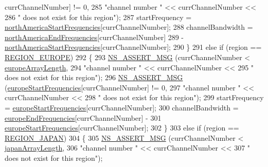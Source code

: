 \begin{DoxyCode}
      currChannelNumber] != 0,
285                          \textcolor{stringliteral}{"channel number "} << currChannelNumber <<
286                          \textcolor{stringliteral}{" does not exist for this region"});
287           startFrequency = \hyperlink{namespacens3_abd0dc95c8909f85e962a681d932219d3}{northAmericaStartFrequencies}[currChannelNumber];    
288           channelBandwidth = \hyperlink{namespacens3_a0808a28c1d4e8691369f8d7700e6deaa}{northAmericaEndFrequencies}[currChannelNumber] 
289                              - \hyperlink{namespacens3_abd0dc95c8909f85e962a681d932219d3}{northAmericaStartFrequencies}[currChannelNumber];
290         \}
291       \textcolor{keywordflow}{else} \textcolor{keywordflow}{if} (region == \hyperlink{classns3_1_1TvSpectrumTransmitterHelper_a7b4aafcd25156458e9ec922587169bbeaa28b9c30091d0f924883332dd748e796}{REGION\_EUROPE})
292         \{
293           \hyperlink{assert_8h_aff5ece9066c74e681e74999856f08539}{NS\_ASSERT\_MSG} (currChannelNumber < \hyperlink{namespacens3_ac2219660b69e86f221be17c4f0cfac4d}{europeArrayLength},
294                          \textcolor{stringliteral}{"channel number "} << currChannelNumber <<
295                          \textcolor{stringliteral}{" does not exist for this region"});
296           \hyperlink{assert_8h_aff5ece9066c74e681e74999856f08539}{NS\_ASSERT\_MSG} (\hyperlink{namespacens3_aa7262dcdf15461a937bb8d2afa65288c}{europeStartFrequencies}[currChannelNumber] != 0,
297                          \textcolor{stringliteral}{"channel number "} << currChannelNumber <<
298                          \textcolor{stringliteral}{" does not exist for this region"});
299           startFrequency = \hyperlink{namespacens3_aa7262dcdf15461a937bb8d2afa65288c}{europeStartFrequencies}[currChannelNumber];    
300           channelBandwidth = \hyperlink{namespacens3_a6c355aa904ccf868b6609c0ef6221787}{europeEndFrequencies}[currChannelNumber] - 
301                              \hyperlink{namespacens3_aa7262dcdf15461a937bb8d2afa65288c}{europeStartFrequencies}[currChannelNumber];
302         \}
303       \textcolor{keywordflow}{else} \textcolor{keywordflow}{if} (region == \hyperlink{classns3_1_1TvSpectrumTransmitterHelper_a7b4aafcd25156458e9ec922587169bbeaa08d9e0f51ad5b6a6230db87ed8b2176}{REGION\_JAPAN})
304         \{
305           \hyperlink{assert_8h_aff5ece9066c74e681e74999856f08539}{NS\_ASSERT\_MSG} (currChannelNumber < \hyperlink{namespacens3_a156aac120ce816da1808c0b1a6bd2a01}{japanArrayLength},
306                          \textcolor{stringliteral}{"channel number "} << currChannelNumber <<
307                          \textcolor{stringliteral}{" does not exist for this region"});

\end{DoxyCode}
